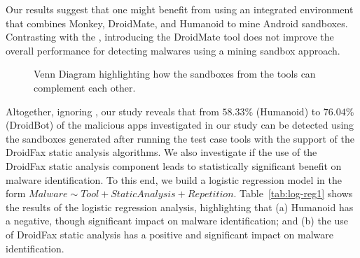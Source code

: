 \begin{finding}
  Our results suggest that one might benefit from using  an integrated
  environment that combines Monkey, DroidMate, and Humanoid to
  mine Android sandboxes. Contrasting with the \blls, introducing the DroidMate 
  tool does not improve the overall performance for detecting malwares using
  a mining sandbox approach.
\end{finding}


\begin{figure}[htb]
  \caption{Venn Diagram highlighting how the sandboxes from the tools can
    complement each other.}
  \label{fig:venn-plot1}
\end{figure}


Altogether, ignoring  \joke, our study reveals that from $58.33$\% (Humanoid)
to $76.04$\% (DroidBot) of the malicious apps investigated in our study can be
detected using the sandboxes generated after running the test case tools with the support of the
DroidFax static analysis algorithms. {\color{red}We also investigate if the use
  of the DroidFax static analysis component leads to statistically significant benefit
  on malware identification. To this end, we build a logistic regression model
in the form $Malware \sim Tool + StaticAnalysis + Repetition$. Table~\ref{tab:log-reg1}
shows the results of the logistic regression analysis, highlighting that
(a) Humanoid has a negative, though significant impact on malware identification; and
(b) the use of DroidFax static analysis has a positive and significant
impact on malware identification.}

